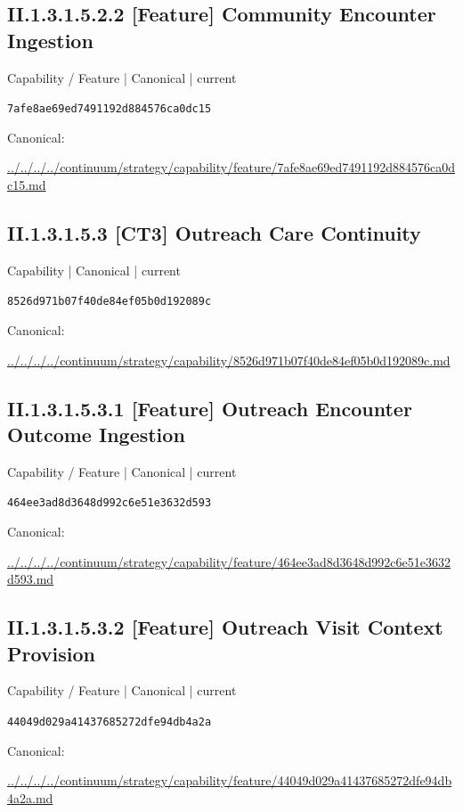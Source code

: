 \documentclass[10pt,a4paper]{article}
\begin{document}
\subsection*{II.1.3.1.5.2.2 [Feature] Community Encounter Ingestion}
{\small Capability / Feature | Canonical | current}\par
\texttt{7afe8ae69ed7491192d884576ca0dc15}\par
Canonical: \par
{\footnotesize\url{../../../../continuum/strategy/capability/feature/7afe8ae69ed7491192d884576ca0dc15.md}}\par
\subsection*{II.1.3.1.5.3 [CT3] Outreach Care Continuity}
{\small Capability | Canonical | current}\par
\texttt{8526d971b07f40de84ef05b0d192089c}\par
Canonical: \par
{\footnotesize\url{../../../../continuum/strategy/capability/8526d971b07f40de84ef05b0d192089c.md}}\par
\subsection*{II.1.3.1.5.3.1 [Feature] Outreach Encounter Outcome Ingestion}
{\small Capability / Feature | Canonical | current}\par
\texttt{464ee3ad8d3648d992c6e51e3632d593}\par
Canonical: \par
{\footnotesize\url{../../../../continuum/strategy/capability/feature/464ee3ad8d3648d992c6e51e3632d593.md}}\par
\subsection*{II.1.3.1.5.3.2 [Feature] Outreach Visit Context Provision}
{\small Capability / Feature | Canonical | current}\par
\texttt{44049d029a41437685272dfe94db4a2a}\par
Canonical: \par
{\footnotesize\url{../../../../continuum/strategy/capability/feature/44049d029a41437685272dfe94db4a2a.md}}\par
\end{document}
